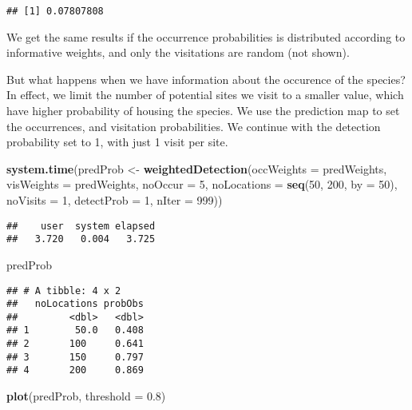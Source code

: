 \documentclass[]{article}
\newenvironment{Shaded}{\begin{snugshade}}{\end{snugshade}}
\newcommand{\KeywordTok}[1]{\textcolor[rgb]{0.13,0.29,0.53}{\textbf{#1}}}
\newcommand{\DataTypeTok}[1]{\textcolor[rgb]{0.13,0.29,0.53}{#1}}
\newcommand{\DecValTok}[1]{\textcolor[rgb]{0.00,0.00,0.81}{#1}}
\newcommand{\FloatTok}[1]{\textcolor[rgb]{0.00,0.00,0.81}{#1}}
\newcommand{\StringTok}[1]{\textcolor[rgb]{0.31,0.60,0.02}{#1}}
\newcommand{\NormalTok}[1]{#1}
\begin{document}
\begin{verbatim}
## [1] 0.07807808
\end{verbatim}

We get the same results if the occurrence probabilities is distributed
according to informative weights, and only the visitations are random
(not shown).

But what happens when we have information about the occurence of the
species? In effect, we limit the number of potential sites we visit to a
smaller value, which have higher probability of housing the species. We
use the prediction map to set the occurrences, and visitation
probabilities. We continue with the detection probability set to 1, with
just 1 visit per site.

\begin{Shaded}
\begin{Highlighting}[]
\KeywordTok{system.time}\NormalTok{(predProb <-}\StringTok{ }\KeywordTok{weightedDetection}\NormalTok{(}\DataTypeTok{occWeights =}\NormalTok{ predWeights, }\DataTypeTok{visWeights =}\NormalTok{ predWeights, }
    \DataTypeTok{noOccur =} \DecValTok{5}\NormalTok{, }\DataTypeTok{noLocations =} \KeywordTok{seq}\NormalTok{(}\DecValTok{50}\NormalTok{, }\DecValTok{200}\NormalTok{, }\DataTypeTok{by =} \DecValTok{50}\NormalTok{), }\DataTypeTok{noVisits =} \DecValTok{1}\NormalTok{, }\DataTypeTok{detectProb =} \DecValTok{1}\NormalTok{, }
    \DataTypeTok{nIter =} \DecValTok{999}\NormalTok{))}
\end{Highlighting}
\end{Shaded}

\begin{verbatim}
##    user  system elapsed 
##   3.720   0.004   3.725
\end{verbatim}

\begin{Shaded}
\begin{Highlighting}[]
\NormalTok{predProb}
\end{Highlighting}
\end{Shaded}

\begin{verbatim}
## # A tibble: 4 x 2
##   noLocations probObs
##         <dbl>   <dbl>
## 1        50.0   0.408
## 2       100     0.641
## 3       150     0.797
## 4       200     0.869
\end{verbatim}

\begin{Shaded}
\begin{Highlighting}[]
\KeywordTok{plot}\NormalTok{(predProb, }\DataTypeTok{threshold =} \FloatTok{0.8}\NormalTok{)}
\end{Highlighting}
\end{Shaded}
\end{document}

